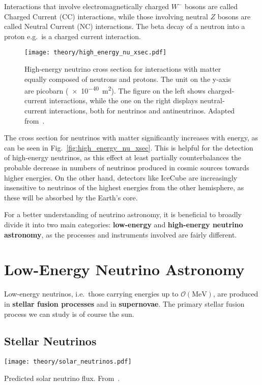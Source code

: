 Interactions that involve electromagnetically charged $W^-$ bosons are called Charged Current (CC) interactions, while those involving neutral $Z$ bosons are called Neutral Current (NC) interactions. The beta decay of a neutron into a proton e.g.\ is a charged current interaction.

\begin{figure}[htb]
    \texttt{[image: theory/high\_energy\_nu\_xsec.pdf]}
    \caption[High-energy neutrino cross section]{High-energy neutrino cross section for interactions with matter equally composed of neutrons and protons. The unit on the y-axis are picobarn (\SI{e-40}{\m\squared}). The figure on the left shows charged-current interactions, while the one on the right displays neutral-current interactions, both for neutrinos and antineutrinos. Adapted from~\cite{CooperSarkar2011}.}
\end{figure}

The cross section for neutrinos with matter significantly increases with energy, as can be seen in Fig.~\ref{fig:high_energy_nu_xsec}. This is helpful for the detection of high-energy neutrinos, as this effect at least partially counterbalances the probable  decrease in numbers of neutrinos produced in cosmic sources towards higher energies. On the other hand, detectors like IceCube are increasingly insensitive to neutrinos of the highest energies from the other hemisphere, as these will be absorbed by the Earth's core.

For a better understanding of neutrino astronomy, it is beneficial to broadly divide it into two main categories: \textbf{low-energy} and \textbf{high-energy neutrino astronomy}, as the processes and instruments involved are fairly different.

\section{Low-Energy Neutrino Astronomy}
Low-energy neutrinos, i.e.\ those carrying energies up to $\mathcal{O}(\unit{\mega\eV})$, are produced in \textbf{stellar fusion processes} and in \textbf{supernovae}. The primary stellar fusion process we can study is of course the sun.

\subsection{Stellar Neutrinos}
\begin{marginfigure}
    \texttt{[image: theory/solar\_neutrinos.pdf]}
    \caption[Predicted solar neutrino flux]{Predicted solar neutrino flux. From~\cite{Agostini2018}.}
\end{marginfigure}



